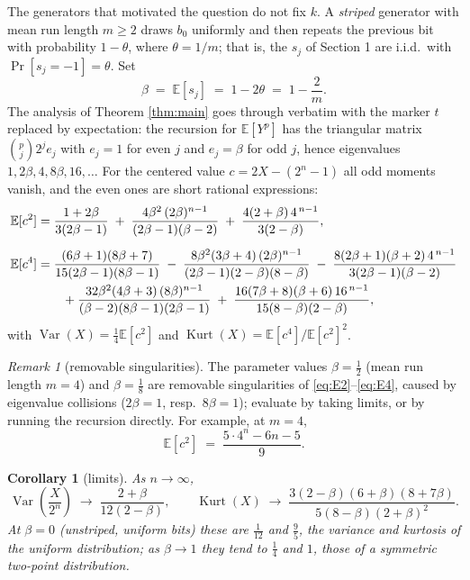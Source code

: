 \documentclass[11pt]{article}
\newtheorem{corollary}[theorem]{Corollary}
\theoremstyle{remark}
\newtheorem{remark}[theorem]{Remark}
\newcommand{\E}{\mathbb{E}}
\newcommand{\Var}{\operatorname{Var}}
\newcommand{\Kurt}{\operatorname{Kurt}}
\begin{document}
The generators that motivated the question do not fix $k$. A \emph{striped} generator with mean
run length $m \ge 2$ draws $b_0$ uniformly and then repeats the previous bit with probability
$1 - \theta$, where $\theta = 1/m$; that is, the $s_j$ of Section 1 are i.i.d.\ with
$\Pr[s_j = -1] = \theta$. Set
\[
\beta \;=\; \E[s_j] \;=\; 1 - 2\theta \;=\; 1 - \frac{2}{m} .
\]
The analysis of Theorem \ref{thm:main} goes through verbatim with the marker $t$ replaced by
expectation: the recursion for $\E[Y^p]$ has the triangular matrix
$\binom{p}{j} 2^j e_j$ with $e_j = 1$ for even $j$ and $e_j = \beta$ for odd $j$, hence
eigenvalues $1, 2\beta, 4, 8\beta, 16, \dots$ For the centered value $c = 2X - (2^n - 1)$ all odd
moments vanish, and the even ones are short rational expressions:
\begin{align}
\E[c^2] &= \frac{1 + 2\beta}{3(2\beta - 1)}
\;+\; \frac{4\beta^2\,(2\beta)^{n-1}}{(2\beta - 1)(\beta - 2)}
\;+\; \frac{4(2 + \beta)\,4^{\,n-1}}{3(2 - \beta)},
\label{eq:E2}\\[6pt]
\E[c^4] &= \frac{(6\beta + 1)(8\beta + 7)}{15 (2\beta - 1)(8\beta - 1)}
\;-\; \frac{8 \beta^2 (3\beta + 4)\,(2\beta)^{n-1}}{(2\beta - 1)(2 - \beta)(8 - \beta)}
\;-\; \frac{8 (2\beta + 1)(\beta + 2)\,4^{\,n-1}}{3 (2\beta - 1)(\beta - 2)}\notag\\
&\qquad + \frac{32 \beta^2 (4\beta + 3)\,(8\beta)^{n-1}}{(\beta - 2)(8\beta - 1)(2\beta - 1)}
\;+\; \frac{16 (7\beta + 8)(\beta + 6)\,16^{\,n-1}}{15 (8 - \beta)(2 - \beta)},
\label{eq:E4}
\end{align}
with $\Var(X) = \tfrac14 \E[c^2]$ and $\Kurt(X) = \E[c^4] / \E[c^2]^2$.

\begin{remark}[removable singularities]
The parameter values $\beta = \tfrac12$ (mean run length $m = 4$) and $\beta = \tfrac18$ are
removable singularities of \eqref{eq:E2}--\eqref{eq:E4}, caused by eigenvalue collisions
($2\beta = 1$, resp.\ $8\beta = 1$); evaluate by taking limits, or by running the recursion
directly. For example, at $m = 4$,
\[
\E[c^2] \;=\; \frac{5 \cdot 4^n - 6n - 5}{9}.
\]
\end{remark}

\begin{corollary}[limits]\label{cor:limits}
As $n \to \infty$,
\[
\Var\!\left( \frac{X}{2^n} \right) \;\longrightarrow\; \frac{2 + \beta}{12 (2 - \beta)},
\qquad
\Kurt(X) \;\longrightarrow\;
\frac{3 (2 - \beta)(6 + \beta)(8 + 7\beta)}{5 (8 - \beta)(2 + \beta)^2}.
\]
At $\beta = 0$ (unstriped, uniform bits) these are $\tfrac{1}{12}$ and $\tfrac{9}{5}$, the
variance and kurtosis of the uniform distribution; as $\beta \to 1$ they tend to $\tfrac14$ and
$1$, those of a symmetric two-point distribution.
\end{corollary}
\end{document}
